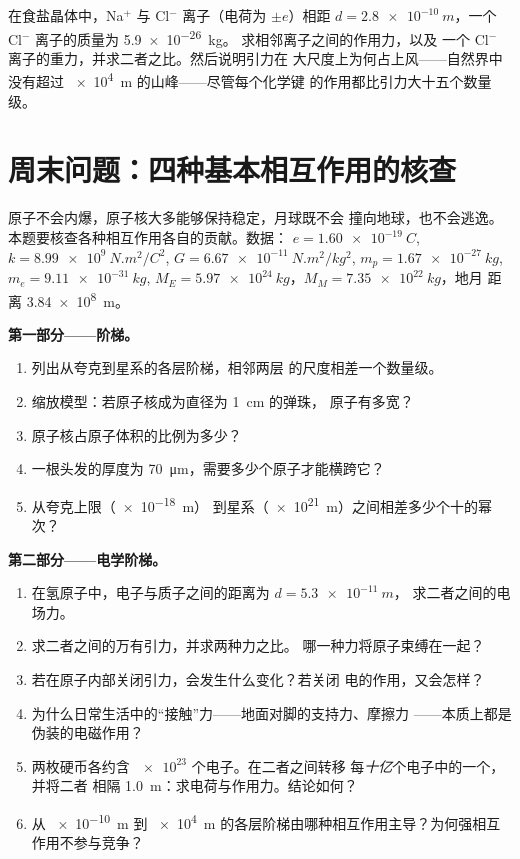 \begin{exercise}[$\star\star\star$]\label{exo:g11:fundamental-interactions:15}
在食盐晶体中，Na$^{+}$ 与 Cl$^{-}$ 离子（电荷为 $\pm e$）相距
$d = \qty{2.8e-10}{m}$，一个 Cl$^{-}$ 离子的质量为 \qty{5.9e-26}{kg}。
求相邻离子之间的作用力，以及
一个 Cl$^{-}$ 离子的重力，并求二者之比。然后说明引力在
大尺度上为何占上风——自然界中没有超过 \qty{e4}{m} 的山峰——尽管每个化学键
的作用都比引力大十五个数量级。
\end{exercise}

\section{周末问题：四种基本相互作用的核查}

\begin{problem}
\label{pb:g11:fundamental-interactions:1}
原子不会内爆，原子核大多能够保持稳定，月球既不会
撞向地球，也不会逃逸。本题要核查各种相互作用各自的贡献。数据：
$e = \qty{1.60e-19}{C}$,
$k = \qty{8.99e9}{N.m^2/C^2}$, $G = \qty{6.67e-11}{N.m^2/kg^2}$,
$m_p = \qty{1.67e-27}{kg}$, $m_e = \qty{9.11e-31}{kg}$,
$M_E = \qty{5.97e24}{kg}$，$M_M = \qty{7.35e22}{kg}$，地月
距离 \qty{3.84e8}{m}。

\medskip
\noindent\textbf{第一部分——阶梯。}
\begin{enumerate}
  \item 列出从夸克到星系的各层阶梯，相邻两层
        的尺度相差一个数量级。
  \item 缩放模型：若原子核成为直径为 \qty{1}{cm} 的弹珠，
        原子有多宽？
  \item 原子核占原子体积的比例为多少？
  \item 一根头发的厚度为 \qty{70}{\micro m}，需要多少个原子才能横跨它？
  \item 从夸克上限（\qty{e-18}{m}）
        到星系（\qty{e21}{m}）之间相差多少个十的幂次？
\end{enumerate}

\medskip
\noindent\textbf{第二部分——电学阶梯。}
\begin{enumerate}[resume]
  \item 在氢原子中，电子与质子之间的距离为 $d = \qty{5.3e-11}{m}$，
        求二者之间的电场力。
  \item 求二者之间的万有引力，并求两种力之比。
        哪一种力将原子束缚在一起？
  \item 若在原子内部关闭引力，会发生什么变化？若关闭
        电的作用，又会怎样？
  \item 为什么日常生活中的“接触”力——地面对脚的支持力、摩擦力
——本质上都是伪装的电磁作用？
  \item 两枚硬币各约含 $\num{e23}$ 个电子。在二者之间转移
        每\emph{十亿}个电子中的一个，并将二者
        相隔 \qty{1.0}{m}：求电荷与作用力。结论如何？
  \item 从 \qty{e-10}{m} 到
        \qty{e4}{m} 的各层阶梯由哪种相互作用主导？为何强相互作用不参与竞争？
\end{enumerate}


\end{problem}
